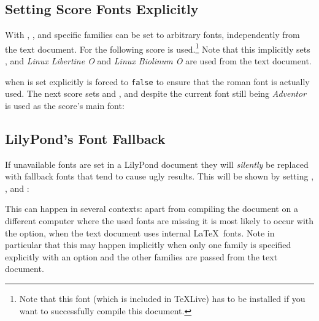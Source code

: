 \documentclass{scrartcl}
\begin{document}
\bigskip
{}

\subsection*{Setting Score Fonts Explicitly}

With , , and  specific
families can be set to arbitrary fonts, independently from the text document.
For the following score  is
used.\footnote{Note that this font (which is included in TeXLive) has to be
installed if you want to successfully compile this document.} Note that this
implicitly sets , and \emph{Linux Libertine O} and
\emph{Linux Biolinum O} are used from the text document.

\bigskip
{}

 when  is set explicitly
 is forced to \texttt{false} to ensure that the
roman font is actually used. The next score sets  and , and despite the current font still being 
\emph{Adventor} is used as the score's main font:

\bigskip
{}

\subsection*{LilyPond's Font Fallback}

If unavailable fonts are set in a LilyPond document they will \emph{silently} be
replaced with fallback fonts that tend to cause ugly results. This will be shown
by setting , ,
and :

\bigskip
{}

This can happen in several contexts: apart from compiling the document on a
different computer where the used fonts are missing it is most likely to occur
with the  option, when the text document uses internal
\LaTeX\ fonts. Note in particular that this may happen implicitly when only one
family is specified explicitly with an option and the other families are passed
from the text document.
\end{document}
